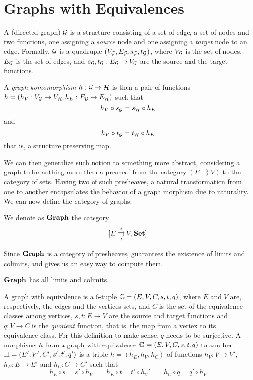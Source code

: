 \section{Graphs with Equivalences}\label{sect:eq_graphs}

A (directed graph) $\mathcal{G}$ is a structure consisting of a set of edge, a set of nodes and two functions, one assigning a \emph{source} node and one assigning a \emph{target} node to an edge. Formally, $\mathcal{G}$ is a quadruple $(V_{\mathcal{G}}, E_{\mathcal{G}}, s_{\mathcal{G}}, t_{\mathcal{G}})$, where $V_{\mathcal{G}}$ is the set of nodes, $E_{\mathcal{G}}$ is the set of edges, and $s_{\mathcal{G}}, t_{\mathcal{G}}: E_{\mathcal{G}} \rightarrow V_{\mathcal{G}}$ are the source and the target functions.

A \emph{graph homomorphism} $h: \mathcal{G \rightarrow H}$ is then a pair of functions $h = (h_V: V_{\mathcal{G}} \rightarrow V_{\mathcal{H}}, h_E: E_{\mathcal{G}} \rightarrow E_{\mathcal{H}})$ such that
    \[
        h_V \circ s_{\mathcal{G}} = s_{\mathcal{H}} \circ h_E
    \]
    and
    \[
        h_V \circ t_{\mathcal{G}} = t_{\mathcal{H}} \circ h_E
    \]
that is, a structure preserving map.

We can then generalize such notion to something more abstract, considering a graph to be nothing more than a presheaf from the category $(E \rightrightarrows V)$ to the category of sets.
Having two of such presheaves, a natural transformation from one to another encapsulates the behavior of a graph morphism due to naturality. We can now define the category of graphs.

\begin{definition}\label{def:cat_of_graph}
    We denote as $\mathbf{Graph}$ the category $$[E \mathrel{\mathop{\rightrightarrows}^{s}_{t}} V , \mathbf{Set}]$$
\end{definition}

Since $\mathbf{Graph}$ is a category of presheaves,  guarantees the existence of limits and colimits, and gives us an easy way to compute them.

\begin{cor}\label{cor:graph_has_co_limits}
    $\mathbf{Graph}$ has all limits and colimits.
\end{cor}

A graph with equivalence is a 6-tuple $\mathbb{G} =  (E, V, C, s, t, q)$, where $E$ and $V$ are, respectively, the edges and the vertices sets, and $C$ is the set of the equivalence classes among vertices, $s,t : E \to V$ are the source and target functions and $q: V \to C$ is the \emph{quotient} function, that is, the map from a vertex to its equivalence class. For this definition to make sense, $q$ needs to be surjective. A morphisms $h$ from a graph with equivalence $\mathbb{G} =  (E, V, C, s, t, q)$ to another $\mathbb{H} = (E', V', C', s', t',  q')$ is a triple $h = (h_E, h_V, h_C)$ of functions $h_V : V \to V'$, $h_E : E \to E'$ and $h_C : C \to C'$ such that
\[
    h_E \circ s = s' \circ h_V \qquad h_E \circ t = t' \circ h_V'\qquad h_C \circ q = q' \circ h_V
\]

